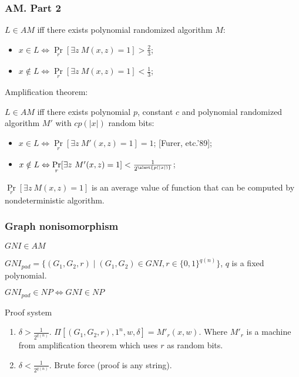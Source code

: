 \begin{frame}
    \frametitle{AM. Part 2}
    
    \begin{definition}[Babai'85]
    	$L \in AM$ iff there exists polynomial randomized algorithm
        $M$:
        \begin{itemize}
			\item $x \in L \Leftrightarrow
        		\Pr\limits_{r}[\exists z~ M(x, z) = 1] 
        		> \frac{2}{3}$;
            \item $x \notin L \Leftrightarrow
        		\Pr\limits_{r}[\exists z~ M(x, z) = 1] 
        		< \frac{1}{3}$;
        \end{itemize}
    \end{definition}

    \pause
    Amplification theorem:
    \begin{theorem}
        $L \in AM$ iff there exists polynomial \alert{$p$}, constant $c$ and
        polynomial randomized algorithm $M'$ with \alert{$c p(|x|)$} random
        bits:
        \begin{itemize}
			\item $x \in L \Leftrightarrow
        		\Pr\limits_{r}[\exists z~ M'(x, z) = 1] = 1$; [Furer, etc.'89]; 
            \item $x \notin L \Leftrightarrow
        		\Pr\limits_{r}[\exists z~ M'(x, z) = 1] 
        		< \frac{1}{2^{\alert{p(|x|)}}}$;
        \end{itemize}
    \end{theorem}

    \pause
    $\Pr\limits_{r}[\exists z~ M(x, z) = 1]$ is an average value of function that can
    be computed by nondeterministic algorithm.
\end{frame}

\begin{frame}
    \frametitle{Graph nonisomorphism}

    \begin{theorem}
    	$GNI \in AM$    
    \end{theorem}
    
	\pause
    \begin{definition}
        $GNI_{pad} = \{(G_1, G_2, r) \mid (G_1, G_2) \in GNI,
        r \in \{0, 1\}^{q(n)}\}$, $q$ is a fixed polynomial.
    \end{definition}

    \pause
    $GNI_{pad} \in NP \Leftrightarrow GNI \in NP$

    \pause

    \begin{block}{Proof system}
        \begin{enumerate}
        	\item $\delta > \frac{1}{2^{q(n)}}$. $\Pi[(G_1, G_2, r), 1^n, w, \delta] =
        		M'_r(x, w)$. Where $M'_r$ is a machine from amplification theorem
                which uses $r$ as random bits.
            \item $\delta < \frac{1}{2^{q(n)}}$. Brute force (proof is any string).
        \end{enumerate}
    \end{block}
\end{frame}